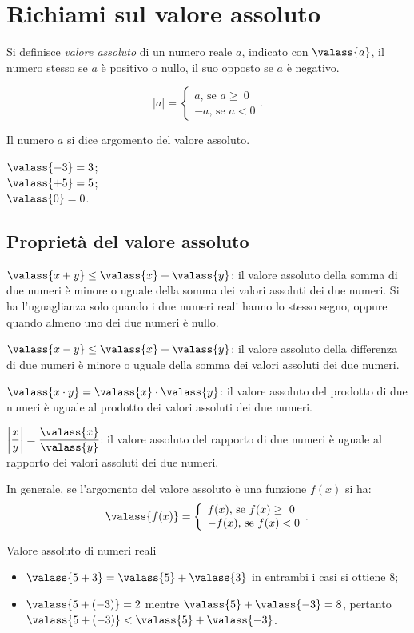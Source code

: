 \section{Richiami sul valore assoluto}

Si definisce \emph{valore assoluto} di un numero reale $a$, indicato con $\valass{a}$, il numero stesso se $a$ è positivo o nullo, il suo opposto se $a$ è negativo.

\[
|a|=\left\{\begin{array}{l}
a\text{, se }a\ge~0\\
-a\text{, se }a<0\end{array}.\right.
\]

Il numero $a$ si dice argomento del valore assoluto.
\begin{multicols}{3}
$\valass{-3}=3$;\\$\valass{+5}=5$;\\$\valass{0}=0$.
\end{multicols}
\subsection{Proprietà del valore assoluto}
$\valass{x+y}\le \valass{x}+\valass{y}$: il valore assoluto della somma di due numeri è minore o uguale della somma dei valori assoluti dei due numeri. Si ha l'uguaglianza solo quando i due numeri reali hanno lo stesso segno, oppure quando almeno uno dei due numeri è nullo.

$\valass{x-y}\le \valass{x}+\valass{y}$: il valore assoluto della differenza di due numeri è minore o uguale della somma dei valori assoluti dei due numeri.

$\valass{x\cdot y}=\valass{x}\cdot \valass{y}$: il valore assoluto del prodotto di due numeri
è uguale al prodotto dei valori assoluti dei due numeri.

$\left |{\dfrac{x}{y}}\right|=\dfrac{\valass{x}}{\valass{y}}$: il valore assoluto del rapporto di due
numeri è uguale al rapporto dei valori assoluti dei due numeri.

In generale, se l'argomento del valore assoluto è una funzione $f(x)$ si ha:
\[
\valass{f(x)}=\left\{\begin{array}{l}
f(x) \text{, se }f(x)\ge~0\\
-f(x)\text{, se }f(x)<0\end{array}.\right.
\]
\begin{exrig}
 \begin{esempio}
 Valore assoluto di numeri reali
 \begin{itemize}
 \item $\valass{5+3}=\valass{5}+\valass{3}$ in entrambi i casi si ottiene $8$;
 \item $\valass{5+(-3)}=2$ mentre $\valass{5}+\valass{-3}=8$, pertanto $\valass{5+(-3)}<\valass{5}+\valass{-3}$.
 \end{itemize}
 \end{esempio}
\end{exrig}

